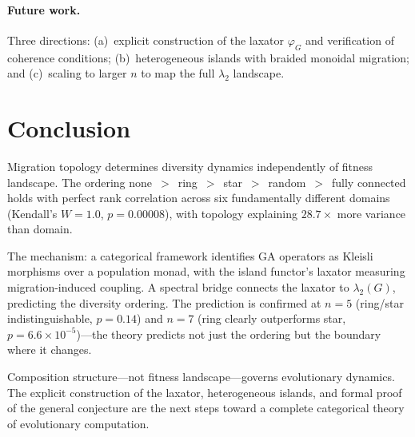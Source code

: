\documentclass[submission,copyright,creativecommons]{eptcs}
\begin{document}
\paragraph{Future work.}
Three directions: (a)~explicit construction of the laxator
$\varphi_G$ and verification of coherence conditions;
(b)~heterogeneous islands with braided monoidal migration; and
(c)~scaling to larger $n$ to map the full $\lambda_2$ landscape.

\section{Conclusion}
\label{sec:conclusion}

Migration topology determines diversity dynamics independently of
fitness landscape. The ordering
none~$>$~ring~$>$~star~$>$~random~$>$~fully connected holds with
perfect rank correlation across six fundamentally different
domains (Kendall's $W = 1.0$, $p = 0.00008$), with topology
explaining $28.7\times$ more variance than domain.

The mechanism: a categorical framework identifies GA operators as
Kleisli morphisms over a population monad, with the island functor's
laxator measuring migration-induced coupling. A spectral bridge
connects the laxator to $\lambda_2(G)$, predicting the diversity
ordering. The prediction is confirmed at $n{=}5$ (ring/star
indistinguishable, $p = 0.14$) and $n{=}7$ (ring clearly
outperforms star, $p = 6.6 \times 10^{-5}$)---the theory predicts
not just the ordering but the boundary where it changes.

Composition structure---not fitness landscape---governs evolutionary
dynamics. The explicit construction of the laxator, heterogeneous
islands, and formal proof of the general conjecture are the next
steps toward a complete categorical theory of evolutionary
computation.

{\small


}
\end{document}
